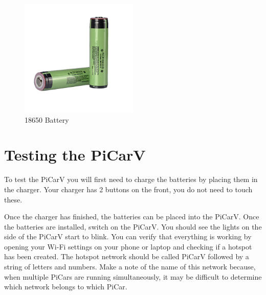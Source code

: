 \documentclass[11pt]{report}
\begin{document}
\begin {figure}[h]
    \centering
    \includegraphics[width=0.5\textwidth]{battery.png}
    \caption{18650 Battery}
    \label{fig: 18650 Battery}
\end{figure}
    

\section{Testing the PiCarV}
To test the PiCarV you will first need to charge the batteries by placing them in the charger. Your charger has 2 buttons on the front, you do not need to touch these.


Once the charger has finished, the batteries can be placed into the PiCarV. Once the batteries are installed, switch on the PiCarV. You should see the lights on the side of the PiCarV start to blink. You can verify that everything is working by opening your Wi-Fi settings on your phone or laptop and checking if a hotspot has been created. The hotspot network should be called PiCarV followed by a string of letters and numbers. Make a note of the name of this network because, when multiple PiCars are running simultaneously, it may be difficult to determine which network belongs to which PiCar.
\end{document}
